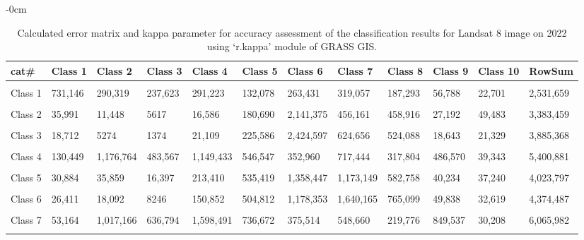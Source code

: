 \documentclass[analytics,article,accept,pdftex,moreauthors]{Definitions/mdpi}
\begin{document}
\begin{table}[H] 
    \caption{Calculated error matrix and kappa parameter for accuracy assessment of the classification results for Landsat 8 image on 2022 using `r.kappa' module of GRASS GIS.}%
    \begin{adjustwidth}{-\extralength}{0cm}
 	\begin{tabularx}{\fulllength}{lllllllllllL}
    \toprule
         \textbf{cat\#} & \textbf{Class 1} & \textbf{Class 2} & \textbf{Class 3} & \textbf{Class 4} & \textbf{Class 5} & \textbf{Class 6} & \textbf{Class 7} & \textbf{Class 8} & \textbf{Class 9} & \textbf{Class 10} & \textbf{RowSum} \\ \hline
      &&&&&&&&&&&\\[-2ex]
        Class 1 & 731,146 & 290,319 & 237,623 & 291,223 & 132,078 & 263,431 & 319,057 & 187,293 & 56,788 & 22,701 & 2,531,659 \\ \hline
      &&&&&&&&&&&\\[-2ex]
        Class 2 & 35,991 & 11,448 & 5617 & 16,586 & 180,690 & 2,141,375 & 456,161 & 458,916 & 27,192 & 49,483 & 3,383,459 \\ \hline
      &&&&&&&&&&&\\[-2ex]
        Class 3 & 18,712 & 5274 & 1374 & 21,109 & 225,586 & 2,424,597 & 624,656 & 524,088 & 18,643 & 21,329 & 3,885,368 \\ \hline
      &&&&&&&&&&&\\[-2ex]
        Class 4 & 130,449 & 1,176,764 & 483,567 & 1,149,433 & 546,547 & 352,960 & 717,444 & 317,804 & 486,570 & 39,343 & 5,400,881 \\ \hline
      &&&&&&&&&&&\\[-2ex]
        Class 5 & 30,884 & 35,859 & 16,397 & 213,410 & 535,419 & 1,358,447 & 1,173,149 & 582,758 & 40,234 & 37,240 & 4,023,797 \\ \hline
      &&&&&&&&&&&\\[-2ex]
        Class 6 & 26,411 & 18,092 & 8246 & 150,852 & 504,812 & 1,178,353 & 1,640,165 & 765,099 & 49,838 & 32,619 & 4,374,487 \\ \hline
      &&&&&&&&&&&\\[-2ex]
        Class 7 & 53,164 & 1,017,166 & 636,794 & 1,598,491 & 736,672 & 375,514 & 548,660 & 219,776 & 849,537 & 30,208 & 6,065,982 \\ \hline
      &&&&&&&&&&&\\[-2ex]

\end{tabularx}
\end{adjustwidth}
\end{table}
\end{document}
